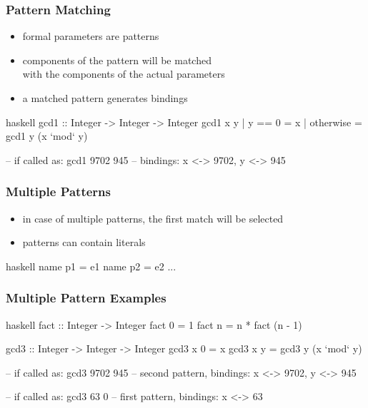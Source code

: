 \documentclass[dvipsnames]{beamer}
\theoremstyle{plain}
\begin{document}
\begin{frame}[fragile]
  \frametitle{Pattern Matching}

  \begin{itemize}
    \item formal parameters are patterns
    \item components of the pattern will be matched\\
      with the components of the actual parameters
    \item a matched pattern generates bindings
  \end{itemize}

  \begin{exampleblock}{}
    \begin{pygments}{haskell}
gcd1 :: Integer -> Integer -> Integer
gcd1 x y
  | y == 0    = x
  | otherwise = gcd1 y (x `mod` y)

-- if called as: gcd1 9702 945
-- bindings: x <-> 9702, y <-> 945
    \end{pygments}
  \end{exampleblock}
\end{frame}

\begin{frame}[fragile]
  \frametitle{Multiple Patterns}

  \begin{itemize}
    \item in case of multiple patterns, the first match will be selected
    \item patterns can contain literals
  \end{itemize}

  \begin{block}{}
    \begin{pygments}{haskell}
name p1 = e1
name p2 = e2
...
    \end{pygments}
  \end{block}
\end{frame}

\begin{frame}[fragile]
  \frametitle{Multiple Pattern Examples}

  \begin{exampleblock}{}
    \begin{pygments}{haskell}
fact :: Integer -> Integer
fact 0 = 1
fact n = n * fact (n - 1)

gcd3 :: Integer -> Integer -> Integer
gcd3 x 0 = x
gcd3 x y = gcd3 y (x `mod` y)

-- if called as: gcd3 9702 945
-- second pattern, bindings: x <-> 9702, y <-> 945

-- if called as: gcd3 63 0
-- first pattern, bindings: x <-> 63
    \end{pygments}
  \end{exampleblock}
\end{frame}
\end{document}
